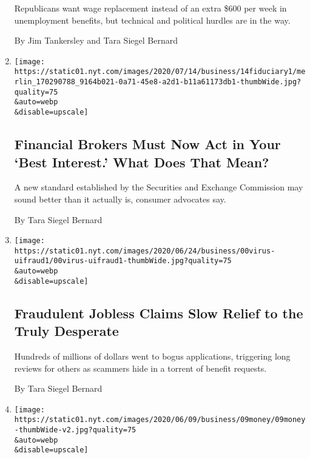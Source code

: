 \begin{enumerate}
  Republicans want wage replacement instead of an extra \$600 per week
  in unemployment benefits, but technical and political hurdles are in
  the way.

  By Jim Tankersley and Tara Siegel Bernard
\item
  \href{/2020/07/16/your-money/fiduciary-duty-investments-best-interest.html}{}

  \texttt{[image: https://static01.nyt.com/images/2020/07/14/business/14fiduciary1/merlin\_170290788\_9164b021-0a71-45e8-a2d1-b11a61173db1-thumbWide.jpg?quality=75\\\&auto=webp\\\&disable=upscale]}

  \hypertarget{financial-brokers-must-now-act-in-your-best-interest-what-does-that-mean}{%
  \subsection{Financial Brokers Must Now Act in Your `Best Interest.'
  What Does That
  Mean?}\label{financial-brokers-must-now-act-in-your-best-interest-what-does-that-mean}}

  A new standard established by the Securities and Exchange Commission
  may sound better than it actually is, consumer advocates say.

  By Tara Siegel Bernard
\item
  \href{/2020/07/02/your-money/coronavirus-unemployment-fraud.html}{}

  \texttt{[image: https://static01.nyt.com/images/2020/06/24/business/00virus-uifraud1/00virus-uifraud1-thumbWide.jpg?quality=75\\\&auto=webp\\\&disable=upscale]}

  \hypertarget{fraudulent-jobless-claims-slow-relief-to-the-truly-desperate}{%
  \subsection{Fraudulent Jobless Claims Slow Relief to the Truly
  Desperate}\label{fraudulent-jobless-claims-slow-relief-to-the-truly-desperate}}

  Hundreds of millions of dollars went to bogus applications, triggering
  long reviews for others as scammers hide in a torrent of benefit
  requests.

  By Tara Siegel Bernard
\item
  \href{/2020/06/09/your-money/race-income-equality.html}{}

  \texttt{[image: https://static01.nyt.com/images/2020/06/09/business/09money/09money-thumbWide-v2.jpg?quality=75\\\&auto=webp\\\&disable=upscale]}


\end{enumerate}
